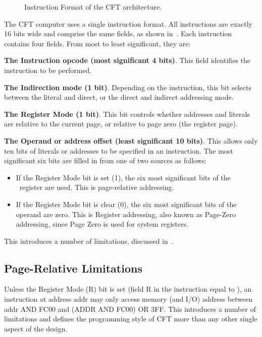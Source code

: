 \begin{figure}[tb]
  \centering
  \caption{\label{fig-if}Instruction Format of the CFT architecture.}
\end{figure}

The CFT computer uses a single instruction format. All instructions are exactly
16 bits wide and comprise the same fields, as shown in~. Each
instruction contains four fields. From most to least significant, they are:

\begin{description}
\item{\bfseries The Instruction opcode (most significant 4 bits)}. This
  field identifies the instruction to be performed.
\item{\bfseries The Indirection mode (1 bit)}. Depending on the instruction,
  this bit selects between the literal and direct, or the direct and
  indirect addressing mode.
\item{\bfseries The Register Mode (1 bit)}. This bit controls whether
  addresses and literals are relative to the current page, or relative
  to page zero (the register page).
\item{\bfseries The Operand or address offset (least significant 10
  bits)}. This allows only ten bits of literals or addresses to be
  specified in an instruction. The most significant six bits are
  filled in from one of two sources as follows:
  \begin{itemize}
  \item If the Register Mode bit is set (1), the six most significant bits
    of the \PC\ register are used. This is page-relative addressing.
  \item If the Register Mode bit is clear (0), the six most
    significant bits of the operand are zero. This is Register
    addressing, also known as Page-Zero addressing, since Page Zero is
    used for system registers.
  \end{itemize}
  This introduces a number of limitations, discussed in~.
\end{description}

\subsection{Page-Relative Limitations}
\label{sec-pagerel}

Unless the Register Mode (R) bit is set (field R in the instruction
equal to ), an instruction at address {\ttfamily addr} may only access
memory (and I/O) address between {\ttfamily addr AND FC00} and {\ttfamily (ADDR
  AND FC00) OR 3FF}. This introduces a number of limitations and
defines the programming style of CFT more than any other single aspect
of the design.

